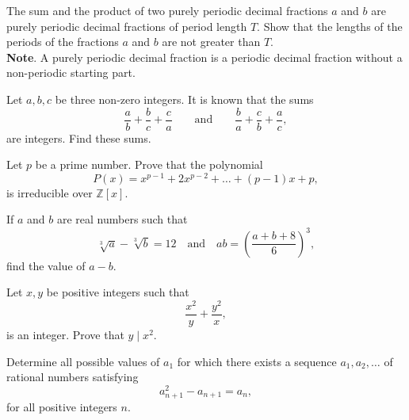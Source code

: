 \begin{question}[name={2006 All--Russian}]
    The sum and the product of two purely periodic decimal fractions $a$ and $b$ are purely periodic decimal fractions of period length $T$. Show that the lengths of the periods of the fractions $a$ and $b$ are not greater than $T$.\\
    \textbf{Note}. A purely periodic decimal fraction is a periodic decimal fraction without a non-periodic starting part.
\end{question}  


\begin{question}[name={2006 Pan--African}]
    Let $a, b, c$ be three non-zero integers. It is known that the sums \[\frac{a}{b}+\frac{b}{c}+\frac{c}{a} \qquad \text{and} \qquad \frac{b}{a}+\frac{c}{b}+\frac{a}{c},\] are integers. Find these sums.
\end{question}


\begin{question}
    Let $p$ be a prime number. Prove that the polynomial
    \[P(x)=x^{p-1}+2x^{p-2}+\ldots+(p-1)x+p,\]
    is irreducible over $\mathbb Z[x]$.
\end{question}



\begin{question}
    If $a$ and $b$ are real numbers such that \[\sqrt[3]a-\sqrt[3]b=12 \quad \text{and} \quad ab=\left(\frac{a+b+8}6\right)^3,\] find the value of $a-b$.
\end{question}


\begin{question}[name={2014 Poland}]
    Let $x, y$ be positive integers such that \[\frac{x^2}{y}+\frac{y^2}{x},\] is an integer. Prove that $y\mid x^2$.
\end{question}

\begin{question}[name={2022 Thailand}]
    Determine all possible values of $a_1$ for which there exists a sequence $a_1, a_2, \dots$ of rational numbers satisfying $$a_{n+1}^2-a_{n+1}=a_n,$$ for all positive integers $n$.
\end{question}


